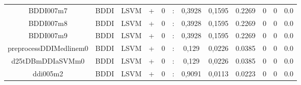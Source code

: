 \documentclass[a4paper]{article}
\begin{document}
\begin{landscape}
\begin{center}
\begin{tabular}{ |c|c|c|c|c|c|c|c|c|c|c|c|}
 	
 
 	
 		
 		\small{ BDDI007m7 } & BDDI & LSVM & +  &  0 &  :  &  0,3928 & 0,1595 & 0.2269  &  0 & 0 & 0.0 \\
 		

 	
 
 	
 		
 		\small{ BDDI007m8 } & BDDI & LSVM & +  &  0 &  :  &  0,3928 & 0,1595 & 0.2269  &  0 & 0 & 0.0 \\
 		

 	
 
 	
 		
 		\small{ BDDI007m9 } & BDDI & LSVM & +  &  0 &  :  &  0,3928 & 0,1595 & 0.2269  &  0 & 0 & 0.0 \\
 		

 	
 
 	
 		
 		\small{ preprocessDDIMedlinem0 } & BDDI & LSVM & +  &  0 &  :  &  0,129 & 0,0226 & 0.0385  &  0 & 0 & 0.0 \\
 		

 	
 
 	
 		
 		\small{ d25tDBmDDIaSVMm0 } & BDDI & LSVM & +  &  0 &  :  &  0,129 & 0,0226 & 0.0385  &  0 & 0 & 0.0 \\
 		

 	
 
 	
 		
 		\small{ ddi005m2 } & BDDI & LSVM & +  &  0 &  :  &  0,9091 & 0,0113 & 0.0223  &  0 & 0 & 0.0 \\
 		

 	
 
 	
 
 	
 
 	
 
 	
 
 	
 
 	
 
 	
 
 	
 
 	
 
 	
 
 	
 
 	
 
 	
 
 	
 
 	
 
 	
 
 	
 
 	
 
 	
 
 	
 

\end{tabular}
\end{center}
\end{landscape}
\end{document}
